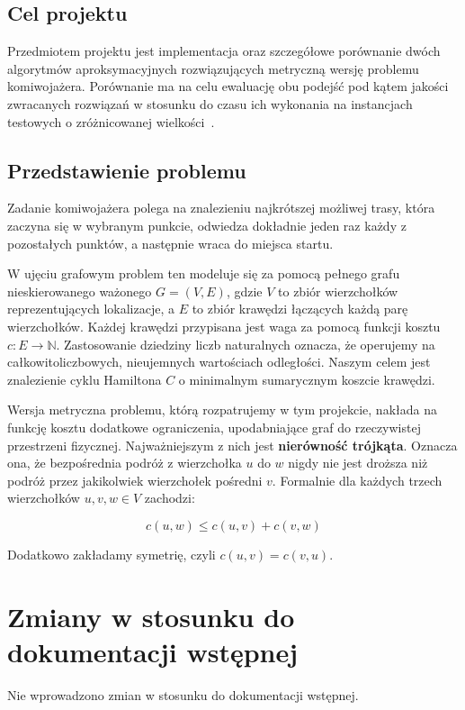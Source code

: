 \documentclass{article}
\theoremstyle{definition}
\theoremstyle{plain}
\theoremstyle{remark}
\begin{document}
\subsection{Cel projektu}

Przedmiotem projektu jest implementacja oraz szczegółowe porównanie dwóch algorytmów aproksymacyjnych rozwiązujących metryczną wersję problemu komiwojażera. Porównanie ma na celu ewaluację obu podejść pod kątem jakości zwracanych rozwiązań w stosunku do czasu ich wykonania na instancjach testowych o zróżnicowanej wielkości~\cite{dokumentacja_wstepna_tsp}.

\subsection{Przedstawienie problemu}

Zadanie komiwojażera polega na znalezieniu najkrótszej możliwej trasy, która zaczyna się w wybranym punkcie, odwiedza dokładnie jeden raz każdy z pozostałych punktów, a następnie wraca do miejsca startu.

W ujęciu grafowym problem ten modeluje się za pomocą pełnego grafu nieskierowanego ważonego $G = (V, E)$, gdzie $V$ to zbiór wierzchołków reprezentujących lokalizacje, a $E$ to zbiór krawędzi łączących każdą parę wierzchołków. Każdej krawędzi przypisana jest waga za pomocą funkcji kosztu $c: E \to \mathbb{N}$. Zastosowanie dziedziny liczb naturalnych oznacza, że operujemy na całkowitoliczbowych, nieujemnych wartościach odległości. Naszym celem jest znalezienie cyklu Hamiltona $C$ o minimalnym sumarycznym koszcie krawędzi.

Wersja metryczna problemu, którą rozpatrujemy w tym projekcie, nakłada na funkcję kosztu dodatkowe ograniczenia, upodabniające graf do rzeczywistej przestrzeni fizycznej. Najważniejszym z nich jest \textbf{nierówność trójkąta}. Oznacza ona, że bezpośrednia podróż z wierzchołka $u$ do $w$ nigdy nie jest droższa niż podróż przez jakikolwiek wierzchołek pośredni $v$. Formalnie dla każdych trzech wierzchołków $u, v, w \in V$ zachodzi:

$$c(u, w) \le c(u, v) + c(v, w)$$

\noindent
Dodatkowo zakładamy symetrię, czyli $c(u, v) = c(v, u)$.

\newpage
\section{Zmiany w stosunku do dokumentacji wstępnej}
Nie wprowadzono zmian w stosunku do dokumentacji wstępnej. 
\end{document}
